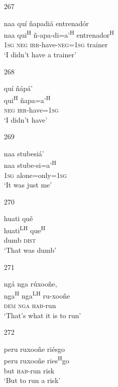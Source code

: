 \begin{itemize}
\item[267]
 
\glll   naa qu\'{i} \~{n}apadi\'{a} entrenad\'{o}r \\
naa qui\textsuperscript{H} \~{n}-apa-di=a'\textsuperscript{H} entrenador\textsuperscript{H} \\
\textsc{1sg} \textsc{neg} \textsc{irr}-have-\textsc{neg}=\textsc{1sg} trainer \\
\glt `I didn't have a trainer'
 


\item[268]
 
\glll   qu\'{i} \~{n}\'{a}p\'{a}' \\
qui\textsuperscript{H} \~{n}apa=a'\textsuperscript{H} \\
\textsc{neg} \textsc{irr}-have=\textsc{1sg} \\
\glt `I didn't have'
 


\item[269]
 
\glll   naa stubesi\'{a}'  \\
naa stube-si=a'\textsuperscript{H}  \\
\textsc{1sg} alone=only=\textsc{1sg} \\
\glt `It was just me'
 


\item[270]
 
\glll   huati qu\v{e}  \\
 huati\textsuperscript{LH} que\textsuperscript{H} \\
dumb \textsc{dist} \\
\glt `That was dumb'
 


\item[271]
 
\glll   ng\'{a} nga r\'{u}xoo\~{n}e,  \\
 nga\textsuperscript{H} nga\textsuperscript{LH} ru-xoo\~{n}e \\
 \textsc{dem} \textsc{nga} \textsc{hab}-run \\
\glt `That's what it is to run'
 


\item[272]
 
\glll   peru  ruxoo\~{n}e ri\'{e}sgo \\
peru  ruxoo\~{n}e ries\textsuperscript{H}go \\
but \textsc{hab}-run risk \\
\glt `But to run a risk'
 



\end{itemize}



